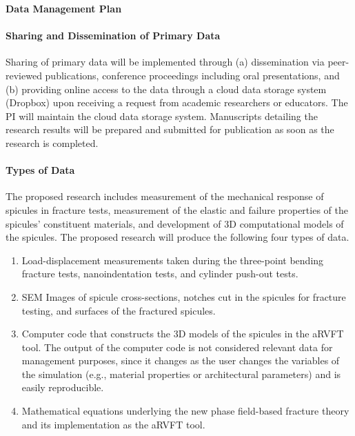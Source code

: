 \documentclass[10 pt, letterpaper]{article}
\begin{document}
\begin{center}\textbf{\large{Data Management Plan}}\end{center}


\paragraph{Sharing and Dissemination of Primary Data}

Sharing of primary data will be implemented through (a) dissemination via peer-reviewed publications, conference proceedings including oral presentations, and (b) providing online access to the data through a cloud data storage system (Dropbox) upon receiving a request from academic researchers or educators. The PI will maintain the cloud data storage system. Manuscripts detailing the research results will be prepared and submitted for publication as soon as the research is completed.



\paragraph{Types of Data}

The proposed research includes measurement of the mechanical response of spicules in fracture tests, measurement of the elastic and failure properties of the spicules' constituent materials, and development of 3D computational models of the spicules. The proposed research will produce the following four types of data.

\begin{enumerate}
	\item Load-displacement measurements taken during the three-point bending fracture tests, nanoindentation tests, and cylinder push-out tests.
	\item  SEM Images of spicule cross-sections, notches cut in the spicules for fracture testing, and surfaces of the fractured spicules.
	\item Computer code that constructs the 3D models of the spicules in the aRVFT tool. The output of the computer code is not considered relevant data for management purposes, since it changes as the user changes the variables of the simulation (e.g., material properties or architectural parameters) and is easily reproducible. 
	\item Mathematical equations underlying the new phase field-based fracture theory and its implementation as the aRVFT tool.
\end{enumerate}
\end{document}
